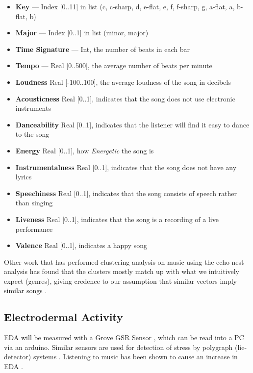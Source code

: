 \documentclass{article}
\begin{document}
	\setlength{\parskip}{0pt}%
	\begin{itemize}
		\item \textbf{Key} --- Index [0..11] in list (c, c-sharp, d, e-flat, e, f, f-sharp, g, a-flat, a, b-flat, b)
		\item \textbf{Major} --- Index [0..1] in list (minor, major)
		\item \textbf{Time Signature} --- Int, the number of beats in each bar
		\item \textbf{Tempo} --- Real [0..500], the average number of beats per minute
		\item \textbf{Loudness} Real [-100..100], the average loudness of the song in decibels
		\item \textbf{Acousticness} Real [0..1], indicates that the song does not use electronic instruments
		\item \textbf{Danceability} Real [0..1], indicates that the listener will find it easy to dance to the song
		\item \textbf{Energy} Real [0..1], how \emph{Energetic} the song is
		\item \textbf{Instrumentalness} Real [0..1], indicates that the song does not have any lyrics
		\item \textbf{Speechiness} Real [0..1], indicates that the song consists of speech rather than singing
		\item \textbf{Liveness} Real [0..1], indicates that the song is a recording of a live performance
		\item \textbf{Valence} Real [0..1], indicates a happy song
	\end{itemize}
	\setlength{\parskip}{0.5\baselineskip}%
	
	Other work that has performed clustering analysis on music using the echo nest analysis has found that the clusters mostly match up with what we intuitively expect (genres), giving credence to our assumption that similar vectors imply similar songs \cite{santos_discovering_2017, rcharlie_analytics_coachellar_2017}.
	
	\subsection{Electrodermal Activity}
	EDA will be measured with a Grove GSR Sensor \cite{seeedstudio_grove_nodate}, which can be read into a PC via an arduino. Similar sensors are used for detection of stress by polygraph (lie-detector) systems \cite{tuckett_detection_1986}. Listening to music has been shown to cause an increase in EDA \cite{rickard_intense_2004, dillman-capentier_effects_2007, thoma_effect_2013}.
	
\end{document}
